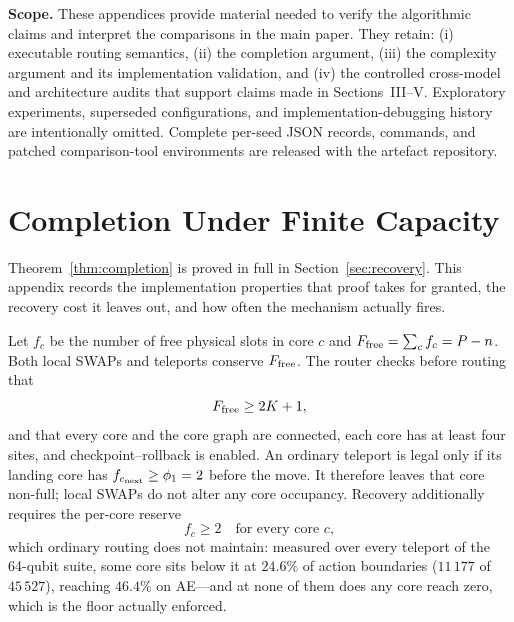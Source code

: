
\appendices
\setcounter{equation}{0}
\setcounter{table}{0}

\noindent\textbf{Scope.}
These appendices provide material needed to verify the algorithmic claims and
interpret the comparisons in the main paper.  They retain: (i) executable
routing semantics, (ii) the completion argument, (iii) the complexity
argument and its implementation validation, and (iv) the controlled
cross-model and architecture audits that support claims made in
Sections~III--V.  Exploratory experiments, superseded configurations, and
implementation-debugging history are intentionally omitted.  Complete
per-seed JSON records, commands, and patched comparison-tool environments are
released with the artefact repository.

\section{Completion Under Finite Capacity}
\label{app:safemode}

Theorem~\ref{thm:completion} is proved in full in
Section~\ref{sec:recovery}.  This appendix records the implementation
properties that proof takes for granted, the recovery cost it leaves out, and
how often the mechanism actually fires.

Let $f_c$ be the number of free physical slots in core $c$ and
$F_{\rm free}=\sum_c f_c=P-n$.  Both local SWAPs and teleports conserve
$F_{\rm free}$.  The router checks before routing that
\begin{equation}
 F_{\rm free}\ge 2K+1,
 \label{eq:safe_feasible}
\end{equation}
and that every core and the core graph are connected, each core has at least
four sites, and checkpoint--rollback is enabled.  An ordinary teleport is
legal only if its landing core has $f_{c_{\rm next}}\ge\phi_1=2$ before the
move.  It therefore leaves that core non-full; local SWAPs do not alter any
core occupancy.  Recovery additionally requires the per-core reserve
\begin{equation}
 f_c \ge 2 \quad\text{for every core } c,
 \label{eq:safe_invariant}
\end{equation}
which ordinary routing does not maintain: measured over every teleport of the
64-qubit suite, some core sits below it at $24.6\%$ of action boundaries
($11\,177$ of $45\,527$), reaching $46.4\%$ on AE---and at none of them does
any core reach zero, which is the floor actually enforced.

